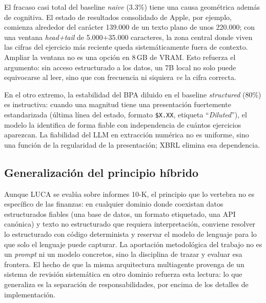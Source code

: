 \documentclass[conference]{IEEEtran}
\begin{document}
El fracaso casi total del baseline \textit{naive} (3.3\%) tiene una causa
geométrica además de cognitiva. El estado de resultados consolidado de Apple, por
ejemplo, comienza alrededor del carácter 139.000 de un texto plano de unos
220.000; con una ventana \textit{head+tail} de 5.000$+$35.000 caracteres, la zona
central donde viven las cifras del ejercicio más reciente queda sistemáticamente
fuera de contexto. Ampliar la ventana no es una opción en 8\,GB de VRAM. Esto
refuerza el argumento: sin acceso estructurado a los datos, un 7B local no solo
puede equivocarse al leer, sino que con frecuencia ni siquiera \emph{ve} la cifra
correcta.

En el otro extremo, la estabilidad del BPA diluido en el baseline
\textit{structured} (80\%) es instructiva: cuando una magnitud tiene una
presentación fuertemente estandarizada (última línea del estado, formato
\texttt{\$X.XX}, etiqueta ``\textit{Diluted}''), el modelo la identifica de forma
fiable con independencia de cuántos ejercicios aparezcan. La fiabilidad del LLM en
extracción numérica no es uniforme, sino una función de la regularidad de la
presentación; XBRL elimina esa dependencia.

\subsection{Generalización del principio híbrido}
Aunque LUCA se evalúa sobre informes 10-K, el principio que lo vertebra no es
específico de las finanzas: en cualquier dominio donde coexistan datos
estructurados fiables (una base de datos, un formato etiquetado, una API
canónica) y texto no estructurado que requiera interpretación, conviene resolver
lo estructurado con código determinista y reservar el modelo de lenguaje para lo
que solo el lenguaje puede capturar. La aportación metodológica del trabajo no es
un \textit{prompt} ni un modelo concretos, sino la disciplina de trazar y evaluar
esa frontera. El hecho de que la misma arquitectura multiagente provenga de un
sistema de revisión sistemática en otro dominio refuerza esta lectura: lo que
generaliza es la separación de responsabilidades, por encima de los detalles de
implementación.
\end{document}

